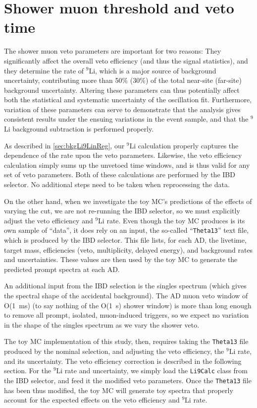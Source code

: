 \documentclass[../thesis.tex]{subfiles}
\begin{document}
\section{Shower muon threshold and veto time}
\label{sec:cutVaryShowerMuon}

The shower muon veto parameters are important for two reasons: They significantly affect the overall veto efficiency (and thus the signal statistics), and they determine the rate of $^9$Li, which is a major source of background uncertainty, contributing more than 50\% (30\%) of the total near-site (far-site) background uncertainty. Altering these parameters can thus potentially affect both the statistical and systematic uncertainty of the oscillation fit. Furthermore, variation of these parameters can serve to demonstrate that the analysis gives consistent results under the ensuing variations in the event sample, and that the $^9$Li background subtraction is performed properly.

As described in \autoref{sec:bkgLi9LinReg}, our $^9$Li calculation properly captures the dependence of the rate upon the veto parameters. Likewise, the veto efficiency calculation simply sums up the unvetoed time windows, and is thus valid for any set of veto parameters. Both of these calculations are performed by the IBD selector. No additional steps need to be taken when reprocessing the data.

On the other hand, when we investigate the toy MC's predictions of the effects of varying the cut, we are not re-running the IBD selector, so we must explicitly adjust the veto efficiency and $^9$Li rate. Even though the toy MC produces is its own sample of ``data'', it does rely on an input, the so-called ``\texttt{Theta13}'' text file, which is produced by the IBD selector. This file lists, for each AD, the livetime, target mass, efficiencies (veto, multiplicity, delayed energy), and background rates and uncertainties. These values are then used by the toy MC to generate the predicted prompt spectra at each AD\@.

An additional input from the IBD selection is the singles spectrum (which gives the spectral shape of the accidental background). The AD muon veto window of O(1~ms) (to say nothing of the O(1~s) shower window) is more than long enough to remove all prompt, isolated, muon-induced triggers, so we expect no variation in the shape of the singles spectrum as we vary the shower veto.

The toy MC implementation of this study, then, requires taking the \texttt{Theta13} file produced by the nominal selection, and adjusting the veto efficiency, the $^9$Li rate, and its uncertainty. The veto efficiency correction is described in the following section. For the $^9$Li rate and uncertainty, we simply load the \texttt{Li9Calc} class from the IBD selector, and feed it the modified veto parameters. Once the \texttt{Theta13} file has been thus modified, the toy MC will generate toy spectra that properly account for the expected effects on the veto efficiency and $^9$Li rate.
\end{document}
